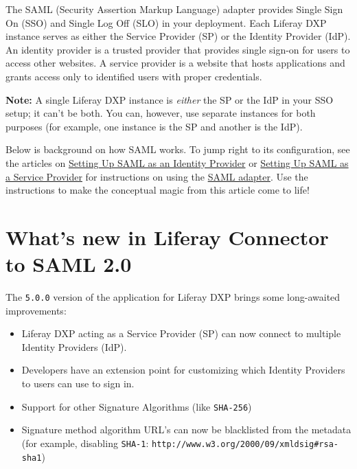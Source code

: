 The SAML (Security Assertion Markup Language) adapter provides Single
Sign On (SSO) and Single Log Off (SLO) in your deployment. Each Liferay
DXP instance serves as either the Service Provider (SP) or the Identity
Provider (IdP). An identity provider is a trusted provider that provides
single sign-on for users to access other websites. A service provider is
a website that hosts applications and grants access only to identified
users with proper credentials.

\noindent\hrulefill

\textbf{Note:} A single Liferay DXP instance is \emph{either} the SP or
the IdP in your SSO setup; it can't be both. You can, however, use
separate instances for both purposes (for example, one instance is the
SP and another is the IdP).

\noindent\hrulefill

Below is background on how SAML works. To jump right to its
configuration, see the articles on
\href{/docs/7-2/deploy/-/knowledge_base/d/setting-up-liferay-as-a-saml-identity-provider}{Setting
Up SAML as an Identity Provider} or
\href{/docs/7-2/deploy/-/knowledge_base/d/setting-up-liferay-as-a-saml-service-provider}{Setting
Up SAML as a Service Provider} for instructions on using the
\href{https://web.liferay.com/marketplace/-/mp/application/15188711}{SAML
adapter}. Use the instructions to make the conceptual magic from this
article come to life!

\section{What's new in Liferay Connector to SAML
2.0}\label{whats-new-in-liferay-connector-to-saml-2.0}

The \texttt{5.0.0} version of the application for Liferay DXP brings
some long-awaited improvements:

\begin{itemize}
\tightlist
\item
  Liferay DXP acting as a Service Provider (SP) can now connect to
  multiple Identity Providers (IdP).
\item
  Developers have an extension point for customizing which Identity
  Providers to users can use to sign in.
\item
  Support for other Signature Algorithms (like \texttt{SHA-256})
\item
  Signature method algorithm URL's can now be blacklisted from the
  metadata (for example, disabling \texttt{SHA-1}:
  \texttt{http://www.w3.org/2000/09/xmldsig\#rsa-sha1})
\end{itemize}

